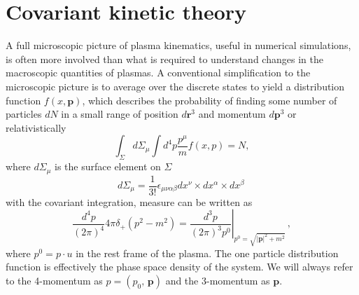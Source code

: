 \section{Covariant kinetic theory}\label{sec:CKT}
A full microscopic picture of plasma kinematics, useful in numerical simulations, is often more involved than what is required to understand changes in the macroscopic quantities of plasmas. A conventional simplification to the microscopic picture is to average over the discrete states to yield a distribution function $f(x,\boldsymbol{p})$, which describes the probability of finding some number of particles $dN$ in a small range of position $d\mathbf{r}^3$ and momentum $d\boldsymbol{p}^3$ or relativistically~\cite{Hakim2011}
\begin{equation}
    \int_{\Sigma}d\Sigma_{\mu}\int  d^4p\frac{p^\mu}{m}f(x,p) = N,
\end{equation}
where $d\Sigma_\mu$ is the surface element on $\Sigma$
\begin{equation}
    d\Sigma_\mu = \frac{1}{3!}\epsilon_{\mu \nu \alpha\beta} dx^\nu \times dx^\alpha\times dx^\beta\,
\end{equation}
with the covariant integration, measure can be written as
\begin{equation}\label{eq:measure} 
 \frac{d^4p}{(2\pi)^4}4\pi \delta_+(p^2-m^2) = \left.\frac{d^3p}{(2\pi)^3p^0}\right|_{p^0 = \sqrt{|\boldsymbol{p}|^2 + m^2}} \,,
\end{equation}
where $p^0 = p \cdot u$ in the rest frame of the plasma. The one particle distribution function is effectively the phase space density of the system. We will always refer to the 4-momentum as $p = (p_0, \, \boldsymbol{p})$ and the 3-momentum as $\boldsymbol{p}$.

